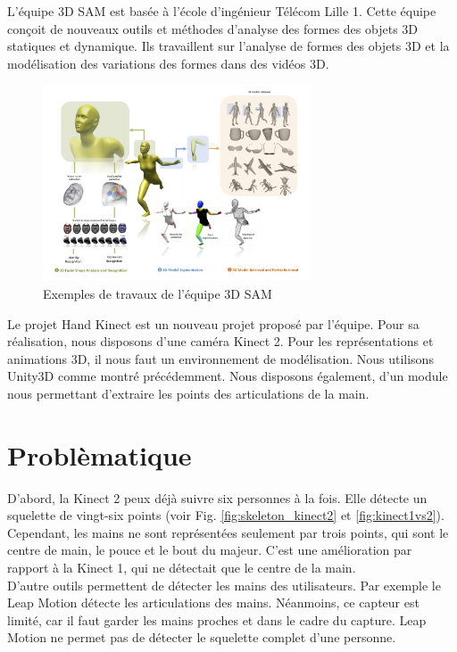 L'équipe 3D SAM est basée à l'école d'ingénieur Télécom Lille 1. 
Cette équipe conçoit de nouveaux outils et méthodes d'analyse des 
formes des objets 3D statiques et dynamique. Ils travaillent sur 
l'analyse de formes des objets 3D et la modélisation des variations 
des formes dans des vidéos 3D.

\begin{figure}[H]
  \begin{center}
    \includegraphics[width=300px]{images/accueil-illus.jpg}
    \caption{Exemples de travaux de l'équipe 3D SAM}
  \end{center}
\end{figure}

Le projet \og Hand Kinect \fg est un nouveau projet proposé par 
l'équipe.
Pour sa réalisation, nous disposons d'une caméra Kinect 2. 
Pour les représentations et animations 3D, il nous faut un environnement 
de modélisation. Nous utilisons Unity3D comme montré précédemment. 
Nous disposons également, d'un module nous permettant d'extraire les 
points des articulations de la main.

\section{Problèmatique}
D'abord, la Kinect 2 peux déjà suivre six personnes à la fois. Elle 
détecte un squelette de vingt-six points (voir Fig. 
\ref{fig:skeleton_kinect2} et \ref{fig:kinect1vs2}). Cependant, les 
mains ne sont représentées seulement par trois points, qui sont le 
centre de main, le pouce et le bout du majeur. C'est une amélioration 
par rapport à la Kinect 1, qui ne détectait que le centre de la main.\\

D'autre outils permettent de détecter les mains des utilisateurs. Par 
exemple le Leap Motion détecte les articulations des mains. Néanmoins,
ce capteur est limité, car il faut garder les mains proches et dans le 
cadre du capture. Leap Motion ne permet pas de détecter le squelette 
complet d'une personne.\\

